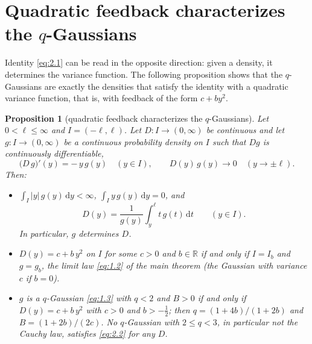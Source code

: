 \documentclass[aip,jmp,preprint,onecolumn,floatfix,superscriptaddress,nofootinbib,11pt]{revtex4-2}
\theoremstyle{plain}
\newtheorem{propositionE}{Proposition}
\theoremstyle{remark}
\numberwithin{equation}{section}
\newcommand{\dd}{\mathrm{d}}
\begin{document}
 
 
\section{Quadratic feedback characterizes the $q$-Gaussians}\label{app:propE}
 
Identity \eqref{eq:2.1} can be read in the opposite direction: given a density, it determines the variance function. The following proposition shows that the $q$-Gaussians are exactly the densities that satisfy the identity with a quadratic variance function, that is, with feedback of the form $c+by^{2}$.
 
\begin{propositionE}[quadratic feedback characterizes the $q$-Gaussians]\label{prop:E}
Let $0<\ell\le\infty$ and $I=(-\ell,\ell)$. Let $D:I\to(0,\infty)$ be continuous and let $g:I\to(0,\infty)$ be a continuous probability density on $I$ such that $Dg$ is continuously differentiable,
\begin{equation}
\big(D\,g\big)'(y)=-\,y\,g(y)\quad(y\in I),\qquad D(y)\,g(y)\to0\quad(y\to\pm \ell).
\label{eq:2.2}
\end{equation}
Then:
\begin{itemize}
\item[(i)] $\int_I|y|\,g(y)\,\dd y<\infty$, $\int_I y\,g(y)\,\dd y=0$, and
\begin{equation}
D(y)=\frac{1}{g(y)}\int_y^{\ell}t\,g(t)\,\dd t\qquad(y\in I).
\label{eq:2.3}
\end{equation}
In particular, $g$ determines $D$.
\item[(ii)] $D(y)=c+b\,y^{2}$ on $I$ for some $c>0$ and $b\in\mathbb R$ if and only if $I=I_b$ and $g=g_b$, the limit law \eqref{eq:1.2} of the main theorem (the Gaussian with variance $c$ if $b=0$).
\item[(iii)] $g$ is a $q$-Gaussian \eqref{eq:1.3} with $q<2$ and $B>0$ if and only if $D(y)=c+b\,y^{2}$ with $c>0$ and $b>-\tfrac12$; then $q=(1+4b)/(1+2b)$ and $B=(1+2b)/(2c)$. No $q$-Gaussian with $2\le q<3$, in particular not the Cauchy law, satisfies \eqref{eq:2.2} for any $D$.
\end{itemize}
\end{propositionE}
 
\end{document}
